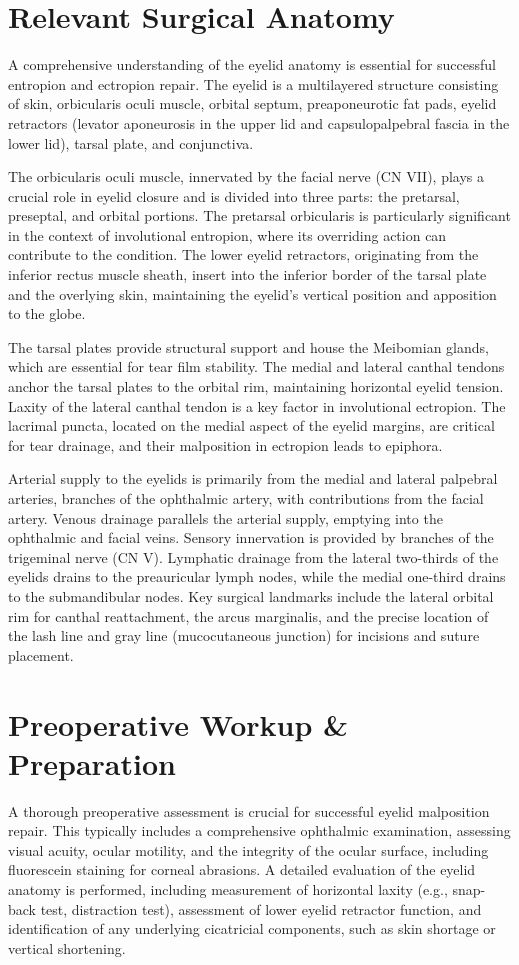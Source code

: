 \section*{Relevant Surgical Anatomy}
A comprehensive understanding of the eyelid anatomy is essential for successful entropion and ectropion repair. The eyelid is a multilayered structure consisting of skin, orbicularis oculi muscle, orbital septum, preaponeurotic fat pads, eyelid retractors (levator aponeurosis in the upper lid and capsulopalpebral fascia in the lower lid), tarsal plate, and conjunctiva. 

The orbicularis oculi muscle, innervated by the facial nerve (CN VII), plays a crucial role in eyelid closure and is divided into three parts: the pretarsal, preseptal, and orbital portions. The pretarsal orbicularis is particularly significant in the context of involutional entropion, where its overriding action can contribute to the condition. The lower eyelid retractors, originating from the inferior rectus muscle sheath, insert into the inferior border of the tarsal plate and the overlying skin, maintaining the eyelid's vertical position and apposition to the globe. 

The tarsal plates provide structural support and house the Meibomian glands, which are essential for tear film stability. The medial and lateral canthal tendons anchor the tarsal plates to the orbital rim, maintaining horizontal eyelid tension. Laxity of the lateral canthal tendon is a key factor in involutional ectropion. The lacrimal puncta, located on the medial aspect of the eyelid margins, are critical for tear drainage, and their malposition in ectropion leads to epiphora. 

Arterial supply to the eyelids is primarily from the medial and lateral palpebral arteries, branches of the ophthalmic artery, with contributions from the facial artery. Venous drainage parallels the arterial supply, emptying into the ophthalmic and facial veins. Sensory innervation is provided by branches of the trigeminal nerve (CN V). Lymphatic drainage from the lateral two-thirds of the eyelids drains to the preauricular lymph nodes, while the medial one-third drains to the submandibular nodes. Key surgical landmarks include the lateral orbital rim for canthal reattachment, the arcus marginalis, and the precise location of the lash line and gray line (mucocutaneous junction) for incisions and suture placement.

\section*{Preoperative Workup \& Preparation}
A thorough preoperative assessment is crucial for successful eyelid malposition repair. This typically includes a comprehensive ophthalmic examination, assessing visual acuity, ocular motility, and the integrity of the ocular surface, including fluorescein staining for corneal abrasions. A detailed evaluation of the eyelid anatomy is performed, including measurement of horizontal laxity (e.g., snap-back test, distraction test), assessment of lower eyelid retractor function, and identification of any underlying cicatricial components, such as skin shortage or vertical shortening. 

